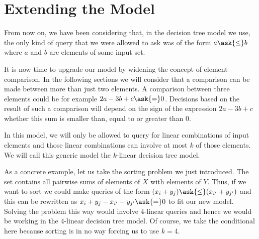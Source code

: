 \section{Extending the Model}

From now on, we have been considering that, in the decision tree
model we use, the only kind of query that we were allowed to ask was of the
form \(a \ask{\le} b \) where \(a\) and \(b\) are elements of some input set.

It is now time to upgrade our model by widening the concept of element
comparison. In the following sections we will consider that a comparison can
be made between more than just two elements. A comparison between three
elements could be for example \(2a - 3b + c \ask{=} 0\). Decisions based on the
result of such a comparison will depend on the sign of the expression
\(2a - 3b + c\) \ie whether this sum is smaller than, equal to or greater than
\(0\).

In this model, we will only be allowed to query for linear combinations of
input elements and those linear combinations can involve at most \(k\) of those
elements. We will call this generic model the \(k\)-linear decision tree model.

As a concrete example, let us take the sorting \XY problem we just introduced.
The set \XY contains all pairwise sums of elements of \(X\) with elements of
\(Y\). Thus, if we want to sort \XY we could make queries of the form \((x_i +
y_j) \ask{\le} (x_{i'} + y_{j'})\) and this can be rewritten as \( x_i +
y_j - x_{i'} - y_{j'} \ask{=} 0\) to fit our new model. Solving the problem
this way would involve \(4\)-linear queries and hence we would be working in
the \(4\)-linear decision tree model. Of course, we take the conditional here
because sorting \XY is in no way forcing us to use \(k=4\).

